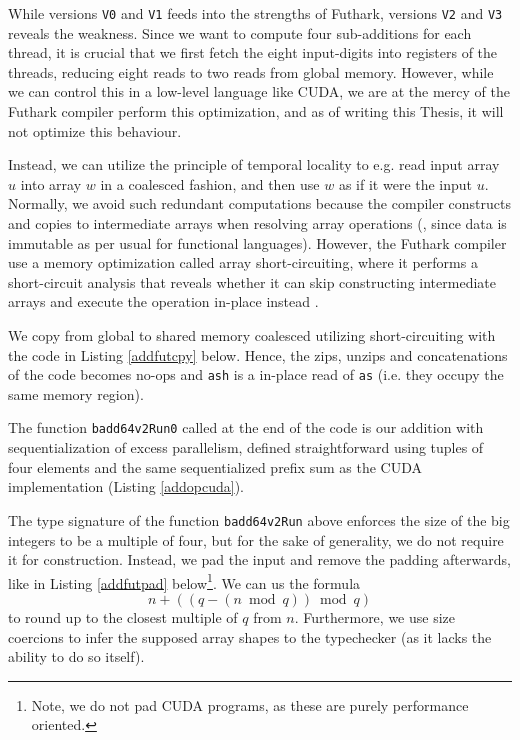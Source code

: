 While versions \texttt{V0} and \texttt{V1} feeds into the strengths of Futhark,
versions \texttt{V2} and \texttt{V3} reveals the weakness. Since we want to
compute four sub-additions for each thread, it is crucial that we first fetch
the eight input-digits into registers of the threads, reducing eight reads to
two reads from global memory. However, while we can control this in a low-level
language like CUDA, we are at the mercy of the Futhark compiler perform this
optimization, and as of writing this Thesis, it will not optimize this behaviour.

Instead, we can utilize the principle of temporal locality to e.g. read input
array $u$ into array $w$ in a coalesced fashion, and then use $w$ as if it were
the input $u$. Normally, we avoid such redundant computations because the
compiler constructs and copies to intermediate arrays when resolving array
operations (, since data is immutable as per usual for functional
languages). However, the Futhark compiler use a memory optimization called array
short-circuiting, where it performs a short-circuit analysis that reveals
whether it can skip constructing intermediate arrays and execute the operation
in-place instead \cite{futhark/sc22mem}.

We copy from global to shared memory coalesced utilizing short-circuiting with
the code in Listing \ref{addfutcpy} below. Hence, the zips, unzips and
concatenations of the code becomes no-ops and \texttt{ash} is a in-place read of
\texttt{as} (i.e. they occupy the same memory region).

The function \texttt{badd64v2Run0} called at the end of the code is our addition
with sequentialization of excess parallelism, defined straightforward using
tuples of four elements and the same sequentialized prefix sum as the CUDA
implementation (Listing \ref{addopcuda}).


The type signature of the function \texttt{badd64v2Run} above enforces the size
of the big integers to be a multiple of four, but for the sake of generality, we
do not require it for construction. Instead, we pad the input and remove the
padding afterwards, like in Listing \ref{addfutpad} below\footnote{Note, we do
  not pad CUDA programs, as these are purely performance oriented.}. We can us
the formula
\begin{equation}
  \label{eq:3}
  n + ((q - (n \bmod q)) \bmod q)
\end{equation}
to round up to the closest multiple of $q$ from $n$. Furthermore, we use size
coercions to infer the supposed array shapes to the typechecker (as it lacks the
ability to do so itself).

